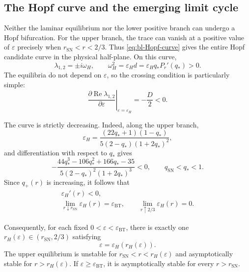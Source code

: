 \documentclass[11pt,reqno]{amsart}
\theoremstyle{plain}
\theoremstyle{definition}
\theoremstyle{remark}
\begin{document}
\subsection{The Hopf curve and the emerging limit cycle}
\label{subsec:bl-Hopf}

Neither the laminar equilibrium nor the lower positive branch
can undergo a Hopf bifurcation. For the upper branch, the trace
can vanish at a positive value of $\varepsilon$ precisely when
$r_{\mathrm{SN}}<r<2/3$. Thus
\eqref{eq:bl-Hopf-curve} gives the entire Hopf candidate curve
in the physical half-plane. On this curve,
\begin{equation}
\lambda_{1,2}=\pm i\omega_H,
\qquad
\omega_H^2
=
\varepsilon_Hd
=
\varepsilon_Hq_*P_r'(q_*)>0.
\label{eq:bl-Hopf-frequency}
\end{equation}
The equilibria do not depend on $\varepsilon$, so the crossing
condition is particularly simple:
\begin{equation}
\left.
\frac{
\partial\operatorname{Re}\lambda_{1,2}
}{
\partial\varepsilon
}
\right|_{\varepsilon=\varepsilon_H}
=
-\frac{D}{2}<0.
\label{eq:bl-Hopf-transversality}
\end{equation}

The curve is strictly decreasing. Indeed, along the upper branch,
\[
\varepsilon_H
=
\frac{
(22q_*+1)(1-q_*)
}{
5(2-q_*)(1+2q_*)^2
},
\]
and differentiation with respect to $q_*$ gives
\[
-\frac{
44q_*^3-106q_*^2+166q_*-35
}{
5(2-q_*)^2(1+2q_*)^3
}
<0,
\qquad
q_{\mathrm{SN}}<q_*<1.
\]
Since $q_+(r)$ is increasing, it follows that
\begin{equation}
\begin{gathered}
\varepsilon_H'(r)<0,
\\
\lim_{r\downarrow r_{\mathrm{SN}}}
\varepsilon_H(r)
=
\varepsilon_{\mathrm{BT}},
\qquad
\lim_{r\uparrow2/3}
\varepsilon_H(r)=0.
\end{gathered}
\label{eq:bl-Hopf-endpoints}
\end{equation}

Consequently, for each fixed
$0<\varepsilon<\varepsilon_{\mathrm{BT}}$, there is exactly one
$r_H(\varepsilon)\in(r_{\mathrm{SN}},2/3)$ satisfying
\[
\varepsilon=\varepsilon_H(r_H(\varepsilon)).
\]
The upper equilibrium is unstable for
$r_{\mathrm{SN}}<r<r_H(\varepsilon)$ and asymptotically stable
for $r>r_H(\varepsilon)$. If
$\varepsilon\geq\varepsilon_{\mathrm{BT}}$, it is asymptotically
stable for every $r>r_{\mathrm{SN}}$.
\end{document}
